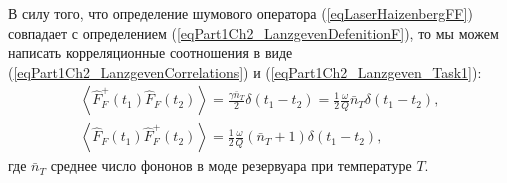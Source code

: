 В силу того, что определение шумового оператора
(\ref{eqLaserHaizenbergFF}) совпадает с
определением (\ref{eqPart1Ch2_LanzgevenDefenitionF}), то мы можем
написать корреляционные соотношения в виде
(\ref{eqPart1Ch2_LanzgevenCorrelations}) и (\ref{eqPart1Ch2_Lanzgeven_Task1}):
\begin{eqnarray}
\left<\hat{F}_{F}^{+}\left(t_1\right)\hat{F}_{F}\left(t_2\right)\right> = 
\frac{\gamma \bar{n}_T}{2} \delta\left(t_1 - t_2\right) = 
\frac{1}{2}\frac{\omega}{Q}\bar{n}_T\delta\left(t_1 - t_2\right),
\nonumber \\
\left<\hat{F}_{F}\left(t_1\right)\hat{F}_{F}^{+}\left(t_2\right)\right> = 
\frac{1}{2}\frac{\omega}{Q}\left(\bar{n}_T + 1 \right)\delta\left(t_1 - t_2\right),
\label{eqLaserHaizenbergFFCorrel}
\end{eqnarray}
где $\bar{n}_T$ среднее число фононов в моде резервуара при
температуре $T$.
